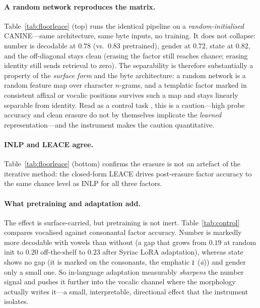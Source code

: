 \documentclass[11pt]{article}
\providecommand{\syriacfont}{}
\providecommand{\RL}[1]{#1}
\newcommand{\syrscript}[1]{{\syriacfont\RL{#1}}}
\newcommand{\syrt}[2]{\syrscript{#1}~(\textit{#2})}
\begin{document}
\paragraph{A random network reproduces the matrix.}
Table~\ref{tab:floorleace} (top) runs the identical pipeline on a
\emph{random-initialised} CANINE---same architecture, same byte inputs, no
training. It does not collapse: number is decodable at $0.78$ (vs.\ $0.83$
pretrained), gender at $0.72$, state at $0.82$, and the off-diagonal stays clean
(erasing the factor still reaches chance; erasing identity still sends retrieval to
zero). The separability is therefore substantially a property of the \emph{surface
form} and the byte architecture: a random network is a random feature map over
character $n$-grams, and a templatic factor marked in consistent affixal or vocalic
positions survives such a map and stays linearly separable from identity. Read as a
control task \citep{hewitt2019control}, this is a caution---high probe accuracy and
clean erasure do not by themselves implicate the \emph{learned} representation---and
the instrument makes the caution quantitative.

\paragraph{INLP and LEACE agree.}
Table~\ref{tab:floorleace} (bottom) confirms the erasure is not an artefact of the
iterative method: the closed-form LEACE drives post-erasure factor accuracy to the
same chance level as INLP for all three factors.

\begin{table}[t]
  \centering
  \small
  
  \caption{Controls (vocalised Syriac, mean${}\pm{}$SD over five seeds). Top: a
  random-init CANINE reproduces decodable factors and a clean off-diagonal, so the
  separability is largely surface-carried. Bottom: closed-form LEACE matches
  iterative INLP, so the erasure result is method-independent.}
  \label{tab:floorleace}
\end{table}

\paragraph{What pretraining and adaptation add.}
The effect is surface-carried, but pretraining is not inert. Table~\ref{tab:control}
compares vocalised against consonantal factor accuracy. Number is markedly more
decodable with vowels than without (a gap that grows from $0.19$ at random init to
$0.20$ off-the-shelf to $0.23$ after Syriac LoRA adaptation), whereas state shows no
gap (it is marked on the consonants, the emphatic \syrt{ܐ}{\=a}) and gender only a
small one. So in-language adaptation measurably \emph{sharpens} the number signal
and pushes it further into the vocalic channel where the morphology actually writes
it---a small, interpretable, directional effect that the instrument isolates.
\end{document}

